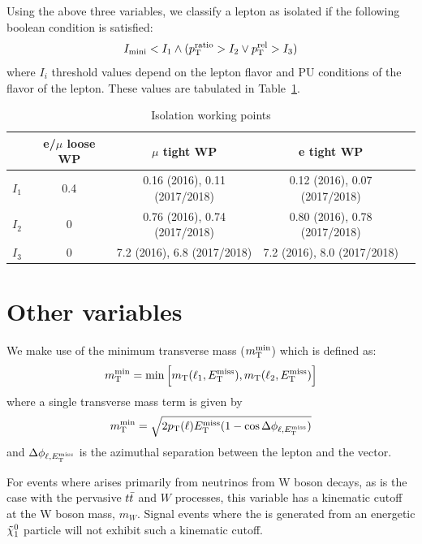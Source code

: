 Using the above three variables, we classify a lepton
as isolated if the following boolean condition is satisfied:
\begin{equation}
  I_\mathrm{mini} < I_1 \wedge ( p_{\mathrm{T}}^\text{ratio} > I_2 \vee p_{\mathrm{T}}^\text{rel} > I_3 )
\end{equation}
where $I_i$ threshold values depend on the lepton flavor and PU conditions
of the flavor of the lepton. These values are tabulated in Table~\ref{tab:isoWPs}.

\begin{table}[h]
    \label{tab:isoWPs}
    \centering
    {\renewcommand{\arraystretch}{1.3}
    \begin{tabular}{l|cccc}
        \hline
        & e/$\mu$ loose WP &  $\mu$ tight WP & e tight WP \\ \hline 
        $I_1$ & 0.4 & 0.16 (2016), 0.11 (2017/2018) & 0.12 (2016), 0.07 (2017/2018) \\
        $I_2$ & 0  & 0.76 (2016), 0.74 (2017/2018) & 0.80 (2016), 0.78 (2017/2018) \\
        $I_3$ & 0  & 7.2 (2016), 6.8 (2017/2018) & 7.2 (2016), 8.0 (2017/2018) \\ \hline
    \end{tabular}}
    \caption{Isolation working points }
\end{table}

\section{Other variables}

We make use of the minimum transverse mass ($m_{\mathrm{T}}^{\text{min}}$) which is defined as:
\begin{equation}
    m_{\mathrm{T}}^{\text{min}} = \mathrm{min}\left[ m_{\mathrm{T}}(\ell_1, E_{\mathrm{T}}^{\text{miss}}), m_{\mathrm{T}}(\ell_2, E_{\mathrm{T}}^{\text{miss}})\right ]
\end{equation}
where a single transverse mass term is given by
\begin{equation}
    m_{\mathrm{T}}^{\text{min}} = \sqrt{2p_{\mathrm{T}}(\ell) E_{\mathrm{T}}^{\text{miss}} (1-\cos\Delta \phi_{\ell,E_{\mathrm{T}}^{\text{miss}}})}
\end{equation}
and $\Delta \phi_{\ell,E_{\mathrm{T}}^{\text{miss}}}$ is the azimuthal separation between the lepton
and the \ptmiss vector.

For events where \ptmiss arises primarily from neutrinos from W boson decays,
as is the case with the pervasive $t\bar{t}$ and $W$ processes, this variable
has a kinematic cutoff at the W boson mass, $m_{W}$. Signal events
where the \ptmiss is generated from an energetic $\tilde{\chi}_1^0$ particle
will not exhibit such a kinematic cutoff.

